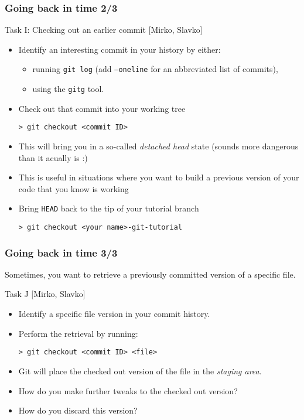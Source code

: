 \begin{frame}[fragile]

\frametitle{Going back in time 2/3}

\begin{block}{Task I: Checking out an earlier commit [Mirko, Slavko]}
	\begin{itemize}
	\item Identify an interesting commit in your history by either:
	\begin{itemize}
	\item running \texttt{git log} (add \texttt{--oneline} for an abbreviated list of commits),
	\item using the \texttt{gitg} tool. 
	\end{itemize}
	\item Check out that commit into your working tree
	\begin{verbatim}
> git checkout <commit ID>
	\end{verbatim}
	\item This will bring you in a so-called \emph{detached head} state (sounds more dangerous than it acually is :)
	\item This is useful in situations where you want to build a previous version of your code that you know is working
	\item Bring \texttt{HEAD} back to the tip of your tutorial branch
	\begin{verbatim}
> git checkout <your name>-git-tutorial
	\end{verbatim}
	\end{itemize}
\end{block}

\end{frame}


\begin{frame}[fragile]

\frametitle{Going back in time 3/3}

Sometimes, you want to retrieve a previously committed version of a specific file.

	\begin{block}{Task J [Mirko, Slavko]}	
	\begin{itemize}	
	\item Identify a specific file version in your commit history.
	\item Perform the retrieval by running:
	\begin{verbatim}
> git checkout <commit ID> <file>
	\end{verbatim}
	\item Git will place the checked out version of the file in the \emph{staging area}.
	\item How do you make further tweaks to the checked out version?
	\item How do you discard this version?
	\end{itemize}	
	
	\end{block}
\end{frame}

